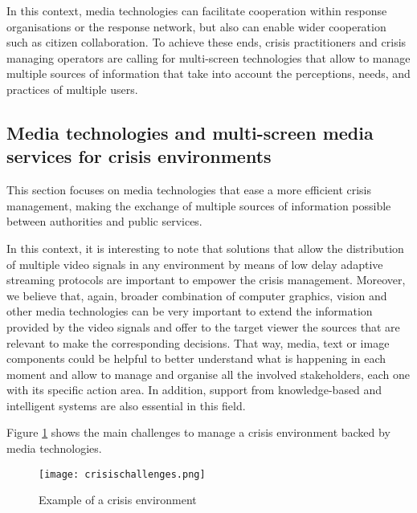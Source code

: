 In this context, media technologies can facilitate cooperation within
response organisations or the response network, but also can enable wider cooperation such as citizen collaboration. To achieve these ends, crisis practitioners and crisis managing operators are calling for multi-screen technologies that allow to manage multiple sources of information that take into account the perceptions, needs, and practices of multiple users. 

\subsection{Media technologies and multi-screen media services for crisis environments}

This section focuses on media technologies that ease a more efficient crisis management, making the exchange of multiple sources of information possible between authorities and public services. 

In this context, it is interesting to note that solutions that allow the distribution of multiple video signals in any environment by means of low delay adaptive streaming protocols are important to empower the crisis management. Moreover, we believe that, again, broader combination of computer graphics, vision and other media technologies can be very important to extend the information provided by the video signals and offer to the target viewer the sources that are relevant to make the corresponding decisions. That way, media, text or image components could be helpful to better understand what is happening in each moment and allow to manage and organise all the involved stakeholders, each one with its specific action area. In addition, support from knowledge-based and intelligent systems are also essential in this field. 

Figure \ref{fig:crisischa} shows the main challenges to manage a crisis environment backed by media technologies.

\begin{figure}
	\begin{center}
		\texttt{[image: crisischallenges.png]}
		\caption{Example of a crisis environment}
		\label{fig:crisischa}
	\end{center}
\end{figure}

